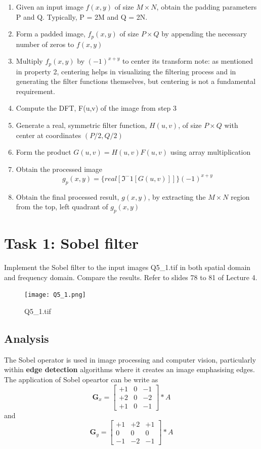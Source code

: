 \documentclass[
	12pt, %
]{style/fphw}
\begin{document}
\begin{enumerate}
    \item Given an input image $f(x,y)$ of size $M \times N$, obtain the padding parameters P and Q. Typically, P = 2M and Q = 2N.
    \item Form a padded image, $f_p(x,y)$ of size $P \times Q$ by appending the necessary number of zeros to $f(x,y)$
    \item Multiply $f_p(x,y)$ by $(-1)^{x+y}$ to center its transform
    note: as mentioned in property 2, centering helps in visualizing the filtering process and in generating the filter functions themselves, but centering is not a fundamental requirement.
    \item Compute the DFT, F(u,v) of the image from step 3 
    \item Generate a real, symmetric filter function, $H(u,v)$, of size $P \times Q$ with center at coordinates $(P/2, Q/2)$
    \item Form the product $G(u,v) = H(u,v)F(u,v)$ using array multiplication
    \item Obtain the processed image $$g_p(x, y)=\{real[\Im^-1 [G(u, v)]] \}(-1)^{x+y}$$ 
    \item Obtain the final processed result, $g(x,y)$, by extracting the $M \times N$ region from the top, left quadrant of $g_p(x,y)$
\end{enumerate}


\newpage
\section*{Task 1: Sobel filter}

\begin{problem}
	Implement the Sobel filter to the input images Q5\_1.tif in both spatial domain and frequency domain. Compare the results. Refer to slides 78 to 81 of Lecture 4.
	\begin{figure}[H]
	    \centering
	    \texttt{[image: Q5\_1.png]}
	    \caption{Q5\_1.tif}
	    \label{Q5_1.tif}
	\end{figure}
\end{problem}

\subsection*{Analysis}

The Sobel operator is used in image processing and computer vision, particularly within \textbf{edge detection} algorithms where it creates an image emphasising edges. The application of Sobel opeartor can be write as $$ \textbf{G}_x = \left[\begin{array}{ccc}
    +1 & 0 & -1 \\
    +2 & 0 & -2 \\
    +1 & 0 & -1 
\end{array}\right] \ast A $$ and $$ \textbf{G}_y = \left[\begin{array}{ccc}
    +1 & +2 & +1 \\
    0 & 0 & 0 \\
    -1 & -2 & -1 
\end{array}\right] \ast A $$
\end{document}
